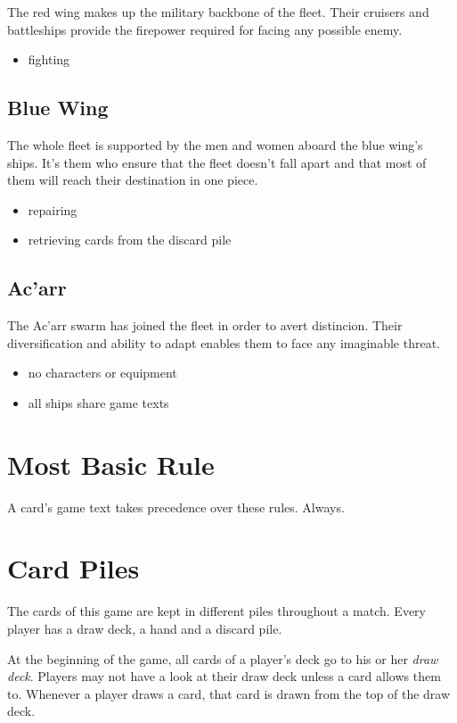 \documentclass[11pt, a4paper]{article}
\begin{document}
The red wing makes up the military backbone of the fleet. Their cruisers and
battleships provide the firepower required for facing any possible enemy.

\begin{itemize}
 \item fighting
\end{itemize}

\subsection{Blue Wing}

The whole fleet is supported by the men and women aboard the blue wing's ships.
It's them who ensure that the fleet doesn't fall apart and that most of them
will reach their destination in one piece.

\begin{itemize}
 \item repairing
 \item retrieving cards from the discard pile
\end{itemize}

\subsection{Ac'arr}

The Ac'arr swarm has joined the fleet in order to avert distincion. Their
diversification and ability to adapt enables them to face any imaginable threat.

\begin{itemize}
 \item no characters or equipment
 \item all ships share game texts
\end{itemize}

\section{Most Basic Rule}

A card's game text takes precedence over these rules. Always.

\section{Card Piles}

The cards of this game are kept in different piles throughout a match. Every
player has a draw deck, a hand and a discard pile.

At the beginning of the game, all cards of a player's deck go to his or her
\emph{draw deck}. Players may not have a look at their draw deck unless a card
allows them to. Whenever a player draws a card, that card is drawn from the top
of the draw deck.
\end{document}
